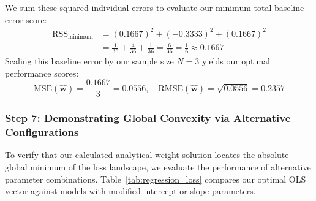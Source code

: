 \documentclass{article}
\begin{document}
We sum these squared individual errors to evaluate our minimum total baseline error score:
\begin{align*}
\text{RSS}_{\text{minimum}} &= (0.1667)^2 + (-0.3333)^2 + (0.1667)^2 \\
&= \frac{1}{36} + \frac{4}{36} + \frac{1}{36} = \frac{6}{36} = \frac{1}{6} \approx \mathbf{0.1667}
\end{align*}
Scaling this baseline error by our sample size $N = 3$ yields our optimal performance scores:
\begin{equation}
\text{MSE}(\hat{\mathbf{w}}) = \frac{0.1667}{3} = \mathbf{0.0556}, \quad \text{RMSE}(\hat{\mathbf{w}}) = \sqrt{0.0556} = \mathbf{0.2357}
\end{equation}

\subsubsection{Step 7: Demonstrating Global Convexity via Alternative Configurations}

To verify that our calculated analytical weight solution locates the absolute global minimum of the loss landscape, we evaluate the performance of alternative parameter combinations. Table~\ref{tab:regression_loss} compares our optimal OLS vector against models with modified intercept or slope parameters.

\begin{table}[htbp]
\centering
\small
\setlength{\tabcolsep}{5pt}
\caption{Linear Regression RSS Evaluation Over Alternative Weight Vectors}
\label{tab:regression_loss}
\end{table}
\end{document}
